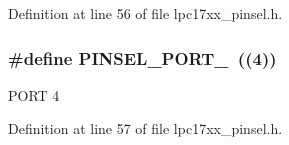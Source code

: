 Definition at line 56 of file lpc17xx\+\_\+pinsel.\+h.

\subsubsection[{\texorpdfstring{P\+I\+N\+S\+E\+L\+\_\+\+P\+O\+R\+T\+\_\+4}{PINSEL_PORT_4}}]{\setlength{\rightskip}{0pt plus 5cm}\#define P\+I\+N\+S\+E\+L\+\_\+\+P\+O\+R\+T\+\_~((4))}\hypertarget{group___p_i_n_s_e_l___public___macros_ga5d5da051e602bac852b777c4d9491776}{}\label{group___p_i_n_s_e_l___public___macros_ga5d5da051e602bac852b777c4d9491776}
P\+O\+RT 4 

Definition at line 57 of file lpc17xx\+\_\+pinsel.\+h.

